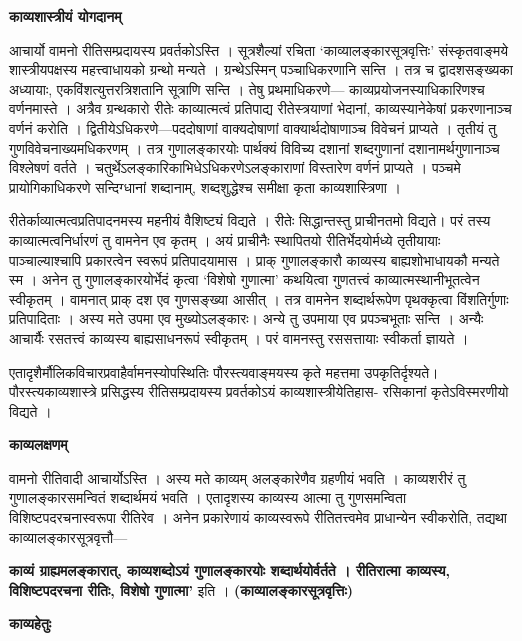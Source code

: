 \documentclass[10pt, a5paper, twoside]{article}
\newcommand{\customparagraph}[1]{
    \noindent \textbf{#1} \par
    \penalty 10000 %
    \vspace{0.1cm plus 0.05cm minus 0.02cm}
    \penalty 10000 %
}
\begin{document}
\customparagraph{\textbf{काव्यशास्त्रीयं योगदानम्}}

आचार्यो वामनो रीतिसम्प्रदायस्य प्रवर्तकोऽस्ति । सूत्रशैल्यां रचिता ‘काव्यालङ्कारसूत्रवृत्तिः’ संस्कृतवाङ्मये शास्त्रीयपक्षस्य महत्त्वाधायको ग्रन्थो मन्यते । ग्रन्थेऽस्मिन् पञ्चाधिकरणानि सन्ति । तत्र च द्वादशसङ्ख्यका अध्यायाः, एकविंशत्युत्तरत्रिशतानि सूत्राणि सन्ति । तेषु प्रथमाधिकरणे— काव्यप्रयोजनस्याधिकारिणश्च वर्णनमास्ते । अत्रैव ग्रन्थकारो रीतेः काव्यात्मत्वं प्रतिपाद्य रीतेस्त्रयाणां भेदानां, काव्यस्यानेकेषां प्रकरणानाञ्च वर्णनं करोति । द्वितीयेऽधिकरणे—पददोषाणां वाक्यदोषाणां वाक्यार्थदोषाणाञ्च विवेचनं प्राप्यते । तृतीयं तु गुणविवेचनाख्यमधिकरणम् । तत्र गुणालङ्कारयोः पार्थक्यं विविच्य दशानां शब्दगुणानां दशानामर्थगुणानाञ्च विश्लेषणं वर्तते । चतुर्थेऽलङ्कारिकाभिधेऽधिकरणेऽलङ्काराणां विस्तारेण वर्णनं प्राप्यते । पञ्चमे प्रायोगिकाधिकरणे सन्दिग्धानां शब्दानाम्, शब्दशुद्धेश्च समीक्षा कृता काव्यशास्त्रिणा ।

रीतेर्काव्यात्मत्वप्रतिपादनमस्य महनीयं वैशिष्ट्यं विद्यते । रीतेः सिद्धान्तस्तु प्राचीनतमो विद्यते। परं तस्य काव्यात्मत्वनिर्धारणं तु वामनेन एव कृतम् । अयं प्राचीनैः स्थापितयो रीतिर्भेदयोर्मध्ये तृतीयायाः पाञ्चाल्याश्चापि प्रकारत्वेन स्वरूपं प्रतिपादयामास । प्राक् गुणालङ्कारौ काव्यस्य बाह्यशोभाधायकौ मन्यते स्म । अनेन तु गुणालङ्कारयोर्भेदं कृत्वा ‘विशेषो गुणात्मा’ कथयित्वा गुणतत्त्वं काव्यात्मस्थानीभूतत्वेन स्वीकृतम् । वामनात् प्राक् दश एव गुणसङ्ख्या आसीत् । तत्र वामनेन शब्दार्थरूपेण पृथक्कृत्वा विंशतिर्गुणाः  प्रतिपादिताः । अस्य मते उपमा एव मुख्योऽलङ्कारः। अन्ये तु उपमाया एव प्रपञ्चभूताः सन्ति । अन्यैः आचार्यैः रसतत्त्वं काव्यस्य बाह्यसाधनरूपं स्वीकृतम् । परं वामनस्तु रससत्तायाः स्वीकर्ता ज्ञायते ।

एतादृशैर्मौलिकविचारप्रवाहैर्वामनस्योपस्थितिः पौरस्त्यवाङ्मयस्य कृते महत्तमा उपकृतिर्दृश्यते। पौरस्त्यकाव्यशास्त्रे प्रसिद्धस्य रीतिसम्प्रदायस्य प्रवर्तकोऽयं काव्यशास्त्रीयेतिहास- रसिकानां कृतेऽविस्मरणीयो विद्यते ।

\customparagraph{\textbf{काव्यलक्षणम्}}

वामनो रीतिवादी आचार्योऽस्ति । अस्य मते काव्यम् अलङ्कारेणैव ग्रहणीयं भवति । काव्यशरीरं तु गुणालङ्कारसमन्वितं शब्दार्थमयं भवति । एतादृशस्य काव्यस्य आत्मा तु गुणसमन्विता विशिष्टपदरचनास्वरूपा रीतिरेव । अनेन प्रकारेणायं काव्यस्वरूपे रीतितत्त्वमेव प्राधान्येन स्वीकरोति, तद्यथा काव्यालङ्कारसूत्रवृत्तौ—

\textbf{काव्यं ग्राह्यमलङ्कारात्, काव्यशब्दोऽयं गुणालङ्कारयोः शब्दार्थयोर्वर्तते । रीतिरात्मा काव्यस्य, विशिष्टपदरचना रीतिः, विशेषो गुणात्मा’} इति । \textbf{(काव्यालङ्कारसूत्रवृत्तिः)}

\customparagraph{\textbf{काव्यहेतुः}}
\end{document}
